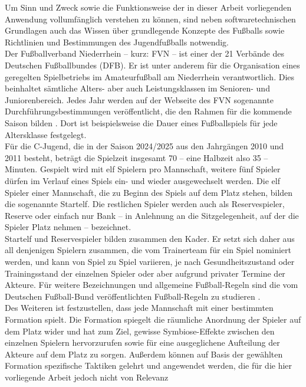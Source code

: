 
Um Sinn und Zweck sowie die Funktionsweise der in dieser Arbeit vorliegenden Anwendung 
vollumfänglich verstehen zu können, sind neben softwaretechnischen Grundlagen auch das 
Wissen über grundlegende Konzepte des Fußballs sowie Richtlinien und Bestimmungen des 
Jugendfußballs notwendig. \\ 
Der Fußballverband Niederrhein -- kurz: FVN -- ist einer der 21 Verbände des Deutschen 
Fußballbundes (DFB). Er ist unter anderem für die Organisation eines geregelten 
Spielbetriebs im Amateurfußball am Niederrhein verantwortlich. Dies beinhaltet 
sämtliche Alters- aber auch Leistungsklassen im Senioren- und Juniorenbereich. Jedes 
Jahr werden auf der Webseite des FVN sogenannte Durchführungsbestimmungen 
veröffentlicht, die den Rahmen für die kommende Saison bilden \cite{fvn2024dufbest}. 
Dort ist beispielsweise die Dauer eines Fußballspiels für jede Altersklasse 
festgelegt. \\ 
Für die C-Jugend, die in der Saison 2024/2025 aus den Jahrgängen 2010 und 2011 
besteht, beträgt die Spielzeit insgesamt 70 -- eine Halbzeit also 35 -- Minuten. 
Gespielt wird mit elf Spielern pro Mannschaft, weitere fünf Spieler dürfen im Verlauf 
eines Spiels ein- und wieder ausgewechselt werden. Die elf Spieler einer Mannschaft, 
die zu Beginn des Spiels auf dem Platz stehen, bilden die sogenannte Startelf. Die 
restlichen Spieler werden auch als Reservespieler, Reserve oder einfach nur Bank -- in 
Anlehnung an die Sitzgelegenheit, auf der die Spieler Platz nehmen -- bezeichnet. \\ 
Startelf und Reservespieler bilden zusammen den Kader. Er setzt sich daher aus all 
denjenigen Spielern zusammen, die vom Trainerteam für ein Spiel nominiert werden, und 
kann von Spiel zu Spiel variieren, je nach Gesundheitszustand oder Trainingsstand der 
einzelnen Spieler oder aber aufgrund privater Termine der Akteure. Für weitere 
Bezeichnungen und allgemeine Fußball-Regeln sind die vom Deutschen Fußball-Bund 
veröffentlichten Fußball-Regeln zu studieren \cite{dfb2024regeln}. \\ 
Des Weiteren ist festzustellen, dass jede Mannschaft mit einer bestimmten Formation 
spielt. Die Formation spiegelt die räumliche Anordnung der Spieler auf dem Platz wider 
und hat zum Ziel, gewisse Symbiose-Effekte zwischen den einzelnen Spielern 
hervorzurufen sowie für eine ausgeglichene Aufteilung der Akteure auf dem Platz zu 
sorgen. Außerdem können auf Basis der gewählten Formation spezifische Taktiken gelehrt 
und angewendet werden, die für die hier vorliegende Arbeit jedoch nicht von Relevanz 
